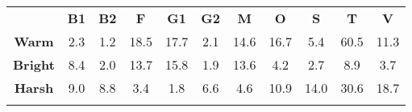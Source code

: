 \begin{tabular}{|c||c|c|c|c|c|c|c|c|c|c|}
	\cline{2-11}
	\multicolumn{1}{c|}{} & \bf{B1} & \bf{B2} & \bf{F} & \bf{G1} & \bf{G2} & \bf{M} & \bf{O} & \bf{S} & \bf{T} & \bf{V} \tabularnewline
	\hhline{-::=:=:=:=:=:=:=:=:=:=:}
	\bf{Warm} &  2.3 &  1.2 & 18.5 & 17.7 &  2.1 & 14.6 & 16.7 &  5.4 & 60.5 & 11.3 \tabularnewline
	\hhline{-||-|-|-|-|-|-|-|-|-|-|}
	\bf{Bright} &  8.4 &  2.0 & 13.7 & 15.8 &  1.9 & 13.6 &  4.2 &  2.7 &  8.9 &  3.7 \tabularnewline
	\hhline{-||-|-|-|-|-|-|-|-|-|-|}
	\bf{Harsh} &  9.0 &  8.8 &  3.4 &  1.8 &  6.6 &  4.6 & 10.9 & 14.0 & 30.6 & 18.7 \tabularnewline
	\hhline{-||-|-|-|-|-|-|-|-|-|-|}
\end{tabular}
